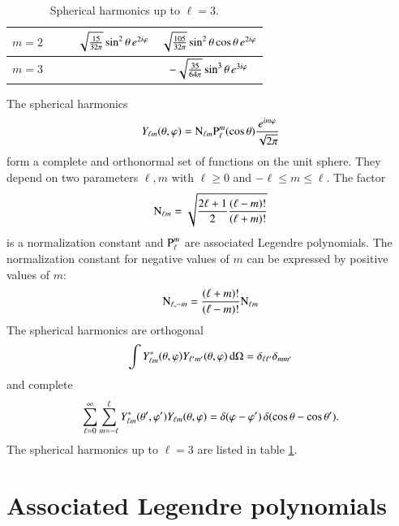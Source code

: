 \begin{table}[t]
\begin{center}
\begin{tabular}{|c|c|c|c|c|}
\hline
$m=2$      &                         &                                    & $\sqrt{\tfrac{15}{32 \pi}} \sin^{2}{\theta} \, e^{2i \varphi}$ & $\sqrt{\tfrac{105}{32 \pi}} \sin^{2}{\theta}\cos{\theta}\,e^{2i \varphi}$ \\
\hline
$m=3$      &                         &                                    &                                               & $-\sqrt{\tfrac{35}{64 \pi}} \sin^{3}{\theta}\,e^{3i\varphi}$ \\
\hline
\end{tabular}
\caption{Spherical harmonics up to $\ell=3$.}
\label{tab:appendix_ylm}
\end{center}
\end{table}

The spherical harmonics
\begin{equation}
\label{appendix_sfun_ylm}
Y_{\ell m}(\theta,\varphi) = \text{N}_{\ell m} {\text{P}_{\ell}^{m}}(\cos\theta) \frac{e^{i m \varphi}}{\sqrt{2\pi}}
\end{equation}
form a complete and orthonormal set of functions on the unit sphere. They
depend on two parameters $\ell,m$ with $\ell\ge 0$ and $-\ell\le m\le \ell$.
The factor
\begin{equation}
\text{N}_{\ell m} = \sqrt{\frac{2\ell+1}{2} \frac{(\ell-m)!}{(\ell+m)!}}
\end{equation}
is a normalization constant and ${\text{P}_{\ell}^{m}}$ are associated Legendre polynomials.
The normalization constant for negative values of $m$ can be expressed by positive
values of $m$:
\begin{equation}
\label{eq:appendix_sfun_nlmm}
\text{N}_{\ell,-m} = \frac{(\ell+m)!}{(\ell-m)!} \text{N}_{\ell m}
\end{equation}
The spherical harmonics are orthogonal
\begin{equation}
\int Y_{\ell m}^*(\theta,\varphi) Y_{\ell^\prime m^\prime}(\theta,\varphi) \, \mathrm{d}\Omega = \delta_{\ell \ell^\prime}\delta_{mm^\prime}
\end{equation}
and complete
\begin{equation}
\sum_{\ell=0}^\infty \sum_{m=-\ell}^\ell Y_{\ell m}^*(\theta^\prime,\varphi^\prime) Y_{\ell m}(\theta,\varphi) = \delta(\varphi-\varphi^\prime)\,\delta(\cos\theta-\cos\theta^\prime).
\end{equation}
The spherical harmonics up to $\ell=3$ are listed in table \ref{tab:appendix_ylm}.



\section{Associated Legendre polynomials}
\label{appendix_sfun_assoc_legendre}

